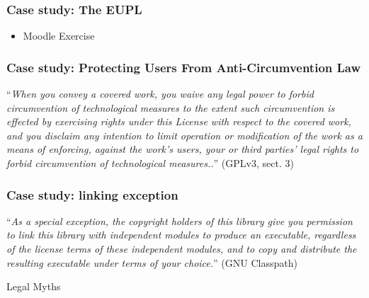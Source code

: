 \begin{frame}
\frametitle{Case study: The EUPL}


\begin{itemize}
\item Moodle Exercise 
\end{itemize}

\end{frame}


\begin{frame}
\frametitle{Case study: Protecting Users From Anti-Circumvention Law}

\pause

\small
``\textit{When you convey a covered work, you waive any legal power to forbid circumvention of technological measures to the extent such circumvention is effected by exercising rights under this License with respect to the covered work, and you disclaim any intention to limit operation or modification of the work as a means of enforcing, against the work's users, your or third parties' legal rights to forbid circumvention of technological measures..}'' (GPLv3, sect. 3)


\end{frame}


\begin{frame}
\frametitle{Case study: linking exception}

\pause

``\textit{As a special exception, the copyright holders of this library give you permission to link this library with independent modules to produce an executable, regardless of the license terms of these independent modules, and to copy and distribute the resulting executable under terms of your choice.}'' (GNU Classpath)

\end{frame}



\begin{frame}

\begin{center}
\huge{Legal Myths}
\end{center}

\end{frame}



